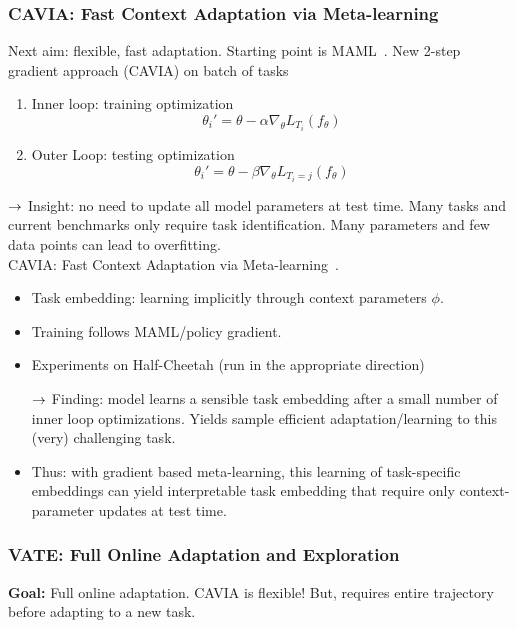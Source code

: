 \subsubsection{CAVIA: Fast Context Adaptation via Meta-learning}

Next aim: flexible, fast adaptation. Starting point is MAML~\cite{finn2017model}. New 2-step gradient approach (CAVIA) on batch of tasks
\begin{enumerate}
    \item  Inner loop: training optimization
    \[
    \theta_i' = \theta - \alpha \nabla_\theta L_{T_i}(f_\theta)
    \]
    \item Outer Loop: testing optimization
    \[
    \theta_i' = \theta - \beta \nabla_\theta L_{T_i=j}(f_\theta)
    \]
\end{enumerate}

$\rightarrow$ Insight: no need to update all model parameters at test time. Many tasks and current benchmarks only require task identification. Many parameters and few data points can lead to overfitting. \\

CAVIA: Fast Context Adaptation via Meta-learning~\cite{zintgraf2019fast}. \\
\begin{itemize}
    \item Task embedding: learning implicitly through context parameters $\phi$.
    \item Training follows MAML/policy gradient.
    \item Experiments on Half-Cheetah (run in the appropriate direction)
    
    $\rightarrow$ Finding: model learns a sensible task embedding after a small number of inner loop optimizations. Yields sample efficient adaptation/learning to this (very) challenging task.
    
    \item Thus: with gradient based meta-learning, this learning of task-specific embeddings can yield interpretable task embedding that require only context-parameter updates at test time.
\end{itemize}


\subsubsection{VATE: Full Online Adaptation and Exploration}


{\bf Goal:} Full online adaptation. CAVIA is flexible! But, requires entire trajectory before adapting to a new task. \\

